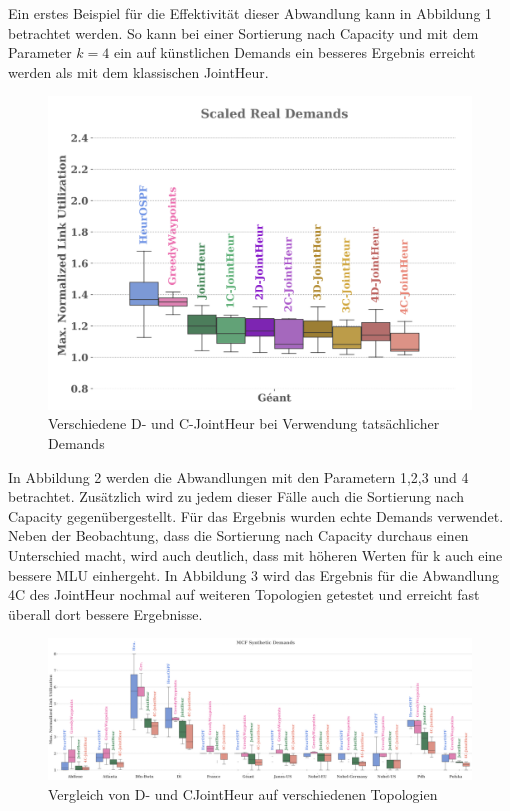 Ein erstes Beispiel für die Effektivität dieser Abwandlung kann in Abbildung 1 betrachtet werden. So kann bei einer Sortierung nach Capacity und mit dem Parameter $k=4$ ein auf künstlichen Demands ein besseres Ergebnis erreicht werden als mit dem klassischen JointHeur. 
\begin{figure}[h]
  \centering 
  \includegraphics[width=\linewidth]{abbildungen/PNG-Bild 2}
  \caption{Verschiedene D- und C-JointHeur bei Verwendung tatsächlicher Demands}
\end{figure}
In Abbildung 2 werden die Abwandlungen mit den Parametern 1,2,3 und 4 betrachtet. Zusätzlich wird zu jedem dieser Fälle auch die Sortierung nach Capacity gegenübergestellt. Für das Ergebnis wurden echte Demands verwendet. Neben der Beobachtung, dass die Sortierung nach Capacity durchaus einen Unterschied macht, wird auch deutlich, dass mit höheren Werten für k auch eine bessere MLU einhergeht. In Abbildung 3 wird das Ergebnis für die Abwandlung 4C des JointHeur nochmal auf weiteren Topologien getestet und erreicht fast überall dort bessere Ergebnisse.
\begin{figure}[h]
  \centering 
  \includegraphics[width=\linewidth]{abbildungen/PNG-Bild 3}
  \caption{Vergleich von D- und CJointHeur auf verschiedenen Topologien}
\end{figure}



